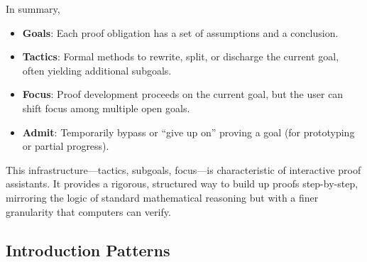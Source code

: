 In summary,
\begin{itemize}
	\item \textbf{Goals}: Each proof obligation has a set of assumptions and a conclusion.  
	\item \textbf{Tactics}: Formal methods to rewrite, split, or discharge the current goal, often yielding additional subgoals.  
	\item \textbf{Focus}: Proof development proceeds on the current goal, but the user can shift focus among multiple open goals.  
	\item \textbf{Admit}: Temporarily bypass or ``give up on'' proving a goal (for prototyping or partial progress).
\end{itemize}
This infrastructure—tactics, subgoals, focus—is characteristic of interactive proof assistants. It provides a rigorous, structured way to build up proofs step-by-step, mirroring the logic of standard mathematical reasoning but with a finer granularity that computers can verify.

\newpage
\subsection{Introduction Patterns}
